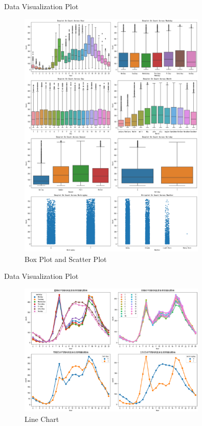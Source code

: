 \documentclass[
size=14pt,
paper=smartboard,  %
mode=present, 		%
display=slides, 	%
style=tuliplab,  	%
pauseslide,
fleqn,leqno]{powerdot}
\begin{document}
	\begin{slide}{Data Visualization Plot}
		\begin{figure}
			\centering
			\includegraphics[width=0.8\textwidth,height=0.5\textwidth]{plot.eps}
			\caption{Box Plot and Scatter Plot} \label{framework}
		\end{figure}
	\end{slide}
	
	\begin{slide}[toc=,bm=]{Data Visualization Plot}
		\begin{figure}
			\centering
			\includegraphics[width=0.8\textwidth,height=0.5\textwidth]{influence.eps}
			\caption{Line Chart} \label{framework}
		\end{figure}
	\end{slide}
	
\end{document}
